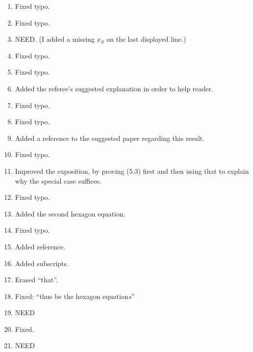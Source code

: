 \documentclass{amsart}
\begin{document}
\begin{enumerate}
\item Fixed typo.

\item Fixed typo.

\item NEED. (I added a missing $x_S$ on the last displayed line.)

\item Fixed typo.

\item Fixed typo.

\item Added the referee's suggested explanation in order to help reader.

\item Fixed typo.

\item Fixed typo.

\item Added a reference to the suggested paper regarding this result.
\item Fixed typo.

\item Improved the exposition, by proving (5.3) first and then using that to explain why the special case suffices.

\item Fixed typo.

\item Added the second hexagon equation.

\item Fixed typo.

\item Added reference.

\item Added subscripts.

\item Erased ``that''.

\item Fixed: ``thus be the hexagon equation\emph{s}''

\item NEED

\item Fixed.

\item NEED

\end{enumerate}
\end{document}
